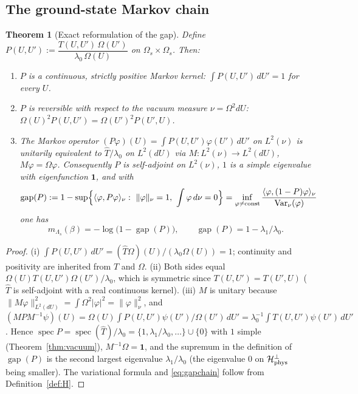 \documentclass[11pt,a4paper]{article}
\newtheorem{theorem}{Theorem}[section]
\theoremstyle{definition}
\theoremstyle{remark}
\DeclareMathOperator{\spec}{spec}
\DeclareMathOperator{\Var}{Var}
\DeclareMathOperator{\gap}{gap}
\newcommand{\cH}{\mathcal{H}}
\newcommand{\hT}{\hat{T}}
\newcommand{\dU}{\,dU}
\newcommand{\ip}[2]{\langle #1,#2\rangle}
\newcommand{\norm}[1]{\lVert #1\rVert}
\begin{document}
\subsection{The ground-state Markov chain}\label{sec:chain}

\begin{theorem}[Exact reformulation of the gap]\label{thm:chain}
Define $P(U,U'):=\dfrac{T(U,U')\,\Omega(U')}{\lambda_0\,\Omega(U)}$ on $\Omega_s\times\Omega_s$. Then:
\begin{enumerate}[label=(\roman*)]
\item $P$ is a continuous, strictly positive Markov kernel: $\int P(U,U')\dU'=1$ for every $U$.
\item $P$ is reversible with respect to the vacuum measure $\nu=\Omega^2dU$: $\Omega(U)^2P(U,U')=\Omega(U')^2P(U',U)$.
\item The Markov operator $(P\varphi)(U)=\int P(U,U')\varphi(U')\dU'$ on $L^2(\nu)$ is unitarily equivalent to
$\hT/\lambda_0$ on $L^2(dU)$ via $M:L^2(\nu)\to L^2(dU)$, $M\varphi=\Omega\varphi$. Consequently $P$ is self-adjoint on
$L^2(\nu)$, $1$ is a simple eigenvalue with eigenfunction $\mathbf 1$, and with
\[
\gap(P):=1-\sup\Bigl\{\ip\varphi{P\varphi}_\nu:\ \norm\varphi_\nu=1,\ \int\varphi\,d\nu=0\Bigr\}
=\inf_{\varphi\ne\text{const}}\frac{\ip\varphi{(1-P)\varphi}_\nu}{\Var_\nu(\varphi)}
\]
one has
\begin{equation}\label{eq:gapchain}
m_{\Lambda_s}(\beta)=-\log\bigl(1-\gap(P)\bigr),\qquad \gap(P)=1-\lambda_1/\lambda_0 .
\end{equation}
\end{enumerate}
\end{theorem}

\begin{proof}
(i) $\int P(U,U')\dU'=(\hT\Omega)(U)/(\lambda_0\Omega(U))=1$; continuity and positivity are inherited from $T$ and $\Omega$.
(ii) Both sides equal $\Omega(U)T(U,U')\Omega(U')/\lambda_0$, which is symmetric since $T(U,U')=T(U',U)$ ($\hT$ is
self-adjoint with a real continuous kernel). (iii) $M$ is unitary because $\norm{M\varphi}^2_{L^2(dU)}=\int\Omega^2|\varphi|^2=\norm\varphi_\nu^2$,
and $(MPM^{-1}\psi)(U)=\Omega(U)\int P(U,U')\psi(U')/\Omega(U')\dU'=\lambda_0^{-1}\int T(U,U')\psi(U')\dU'$. Hence
$\spec P=\spec(\hT)/\lambda_0=\{1,\lambda_1/\lambda_0,\dots\}\cup\{0\}$ with $1$ simple (Theorem~\ref{thm:vacuum}),
$M^{-1}\Omega=\mathbf 1$, and the supremum in the definition of $\gap(P)$ is the second largest eigenvalue
$\lambda_1/\lambda_0$ (the eigenvalue $0$ on $\cH_{\rm phys}^\perp$ being smaller). The variational formula and
\eqref{eq:gapchain} follow from Definition~\ref{def:H}.
\end{proof}
\end{document}
